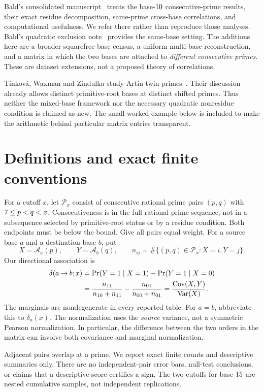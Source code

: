 \documentclass[11pt]{article}
\newcommand{\A}{\mathcal A}
\newcommand{\Cov}{\operatorname{Cov}}
\newcommand{\Var}{\operatorname{Var}}
\begin{document}
Bald's consolidated manuscript~\cite{baldconsolidated} treats the base-$10$
consecutive-prime results, their exact residue decomposition, same-prime
cross-base correlations, and computational usefulness. We refer there rather
than reproduce those analyses. Bald's quadratic exclusion note~\cite{baldexclusion}
provides the same-base setting. The additions here are a broader squarefree-base
census, a uniform multi-base reconstruction, and a matrix in which the two bases
are attached to \emph{different consecutive primes}. These are dataset extensions,
not a proposed theory of correlations.

Tinkov\'{a}, Waxman and Zindulka study Artin twin primes~\cite{twz}.
Their discussion already allows distinct primitive-root bases at distinct shifted
primes. Thus neither the mixed-base framework nor the necessary quadratic
nonresidue condition is claimed as new. The small worked example below is
included to make the arithmetic behind particular matrix entries transparent.

\section{Definitions and exact finite conventions}
For a cutoff $x$, let $\mathcal P_x$ consist of consecutive rational prime pairs
$(p,q)$ with $7\le p<q<x$. Consecutiveness is in the full rational
prime sequence, not in a subsequence selected by primitive-root status or by a
residue condition. Both endpoints must be below the bound. Give all pairs equal
weight. For a source base $a$ and a destination base $b$, put
\[
 X=\A_a(p),\qquad Y=\A_b(q),\qquad
 n_{ij}=\#\{(p,q)\in\mathcal P_x:X=i,Y=j\}.
\]
Our directional association is
\begin{align}
 \delta(a\mathbin{\to}b;x)
 &=\Pr(Y=\One\mid X=\One)-\Pr(Y=\One\mid X=\Zero)\label{eq:delta}\\
 &=\frac{n_{\One\One}}{n_{\One\Zero}+n_{\One\One}}
   -\frac{n_{\Zero\One}}{n_{\Zero\Zero}+n_{\Zero\One}}
 =\frac{\Cov(X,Y)}{\Var(X)}.\nonumber
\end{align}
The marginals are nondegenerate in every reported table. For $a=b$, abbreviate
this to $\delta_a(x)$. The normalization uses the \emph{source} variance, not a
symmetric Pearson normalization. In particular, the difference between the two
orders in the matrix can involve both covariance and marginal normalization.

Adjacent pairs overlap at a prime. We report exact finite counts and descriptive
summaries only. There are no independent-pair error bars, null-test conclusions,
or claims that a descriptive score certifies a sign. The two cutoffs for base
$15$ are nested cumulative samples, not independent replications.
\end{document}
